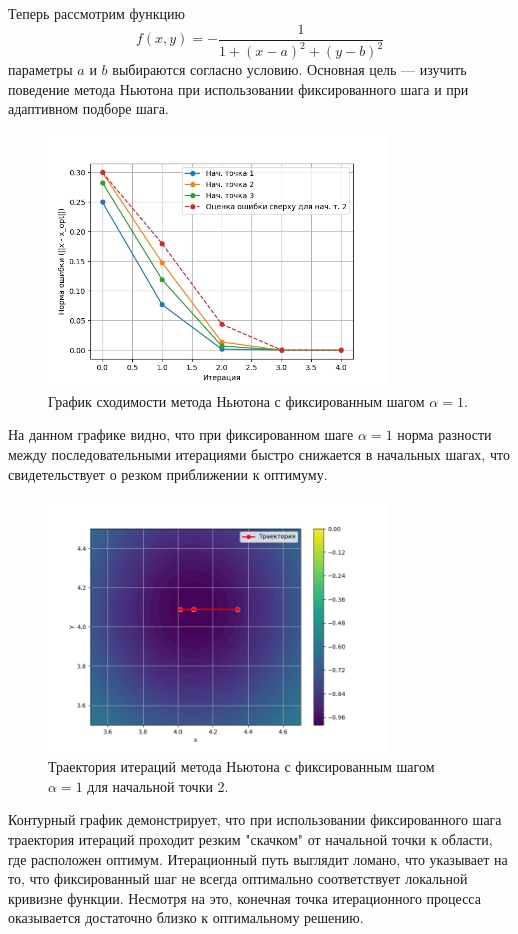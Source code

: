 \documentclass[a4paper,12pt]{article}
\begin{document}
Теперь рассмотрим функцию
\[
f(x,y)=-\frac{1}{1+(x-a)^2+(y-b)^2}
\]
параметры \(a\) и \(b\) выбираются согласно условию. Основная цель --- изучить поведение метода Ньютона при использовании фиксированного шага и при адаптивном подборе шага.

\begin{figure}[H]
    \centering
    \includegraphics[width=0.8\textwidth]{images/newton_fixed_conv.png}
    \caption{График сходимости метода Ньютона с фиксированным шагом \(\alpha=1\).}
\end{figure}
\noindent На данном графике видно, что при фиксированном шаге \(\alpha=1\) норма разности между последовательными итерациями быстро снижается в начальных шагах, что свидетельствует о резком приближении к оптимуму.

\begin{figure}[H]
    \centering
    \includegraphics[width=0.8\textwidth]{images/newton_fixed_traj.png}
    \caption{Траектория итераций метода Ньютона с фиксированным шагом \(\alpha=1\) для начальной точки 2.}
\end{figure}
\noindent Контурный график демонстрирует, что при использовании фиксированного шага траектория итераций проходит резким "скачком" от начальной точки к области, где расположен оптимум. Итерационный путь выглядит ломано, что указывает на то, что фиксированный шаг не всегда оптимально соответствует локальной кривизне функции. Несмотря на это, конечная точка итерационного процесса оказывается достаточно близко к оптимальному решению.
\end{document}
